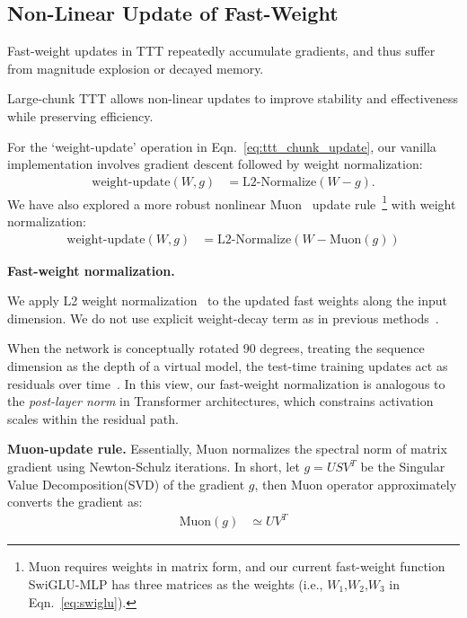 \documentclass{article}
\begin{document}
\subsection{Non-Linear Update of Fast-Weight }

\label{sec:update_rule}

Fast-weight updates in TTT repeatedly accumulate gradients, and thus suffer from magnitude explosion or decayed memory.

Large-chunk TTT allows non-linear updates to improve stability and effectiveness while preserving efficiency.

For the `weight\mbox{-}update' operation in Eqn.~\ref{eq:ttt_chunk_update}, our vanilla implementation involves gradient descent  followed by weight normalization:
\begin{align}
\mathrm{weight\mbox{-}update} (W, g) & = \mathrm{L2\mbox{-}Normalize} (W - g)  .
\label{eq:fast_weight_normalization_nomuon}
\end{align}
We have also explored a more robust nonlinear Muon~\cite{jordan2024muon} update rule~\footnote{Muon requires weights in matrix form, and our current fast-weight function SwiGLU-MLP has three matrices as the weights (i.e., $W_1\mbox{,}W_2\mbox{,}W_3$ in Eqn.~\ref{eq:swiglu}). } with weight normalization:
\begin{align}
\mathrm{weight\mbox{-}update} (W, g) & = \mathrm{L2\mbox{-}Normalize} (W - \mathrm{Muon}(g))  
\label{eq:fast_weight_normalization}
\end{align}

\noindent\textbf{Fast-weight normalization.} 

We apply L2 weight normalization~\cite{salimans2016weight} to the updated fast weights along the input dimension. We do not use explicit weight-decay term as in previous methods~\cite{behrouz2024titans, dao2024transformers, yang2024gated, sun2023retentive}. 

When the network is conceptually rotated 90 degrees, treating the sequence dimension as the depth of a virtual model, the test-time training updates act as residuals over time~\cite{he2015deep}. In this view, our fast-weight normalization is analogous to the \textit{post-layer norm} in Transformer architectures, which constrains activation scales within the residual path.

\noindent\textbf{Muon-update rule.} 
Essentially, Muon normalizes the spectral norm of matrix gradient using Newton-Schulz iterations.
In short, let $g = U S V^T$ be the Singular Value Decomposition(SVD) of the gradient $g$, then Muon operator approximately converts the gradient as:
\begin{align}
    \mathrm{Muon}(g) &\simeq UV^T
\end{align}
\end{document}
